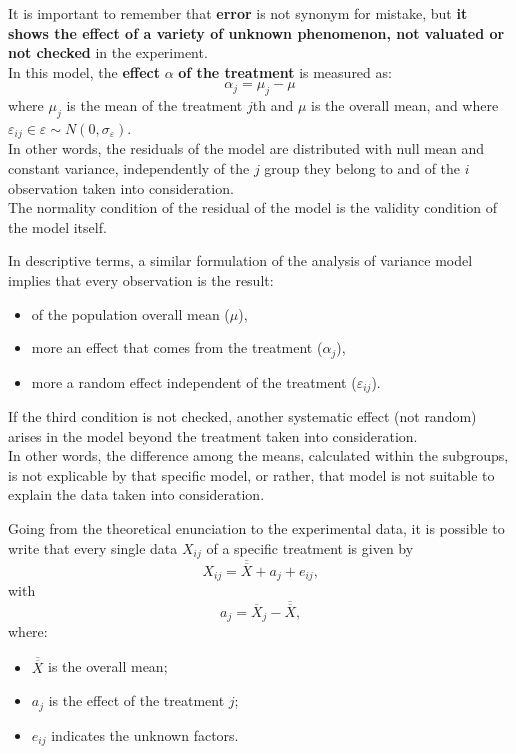 \begin{frame}
  It is important to remember that \textbf{error} is not synonym for mistake, but \textbf{it shows the effect of a variety of unknown phenomenon, not valuated or not checked} in the experiment.\\ 
  In this model, the \textbf{effect} {\boldmath$\alpha$} \textbf{of the treatment} is measured as:
  $$ \alpha_j = \mu_j - \mu $$
  where {\boldmath$\mu_j$} is the mean of the treatment $ j $th and {\boldmath$\mu$} is the overall mean, and where $ \varepsilon_{ij} \in \varepsilon \sim N(0,\sigma_\varepsilon) $.\\
  In other words, the residuals of the model are distributed with null mean and constant variance, independently of the $ j $ group they belong to and of the $ i $ observation taken into consideration.\\
  The normality condition of the residual of the model is the validity condition of the model itself.
\end{frame}

\begin{frame}
  \vspace*{.25cm} 
  In descriptive terms, a similar formulation of the analysis of variance model implies that every observation is the result:\\
  \begin{itemize}
    \item of the population overall mean ($ \mu $),
    \item more an effect that comes from the treatment ($ \alpha_j $),
    \item more a random effect independent of the treatment ($ \varepsilon_{ij} $).
  \end{itemize}
  \vspace*{.25cm}
  If the third condition is not checked, another systematic effect (not random) arises in the model beyond the treatment taken into consideration. \\
  \vspace*{.25cm} 
  In other words, the difference among the means, calculated within the subgroups, is not explicable by that specific model, or rather, that model is not suitable to explain the data taken into consideration.
\end{frame}

\begin{frame}
  \vspace*{.25cm} 
  Going from the theoretical enunciation to the experimental data, it is possible to write that every single data {\boldmath$X_{ij}$} of a specific treatment is given by
  $$ X_{ij} = \overline{\overline{X}}+a_j+e_{ij} \mbox{,} $$
  with
  $$ a_j = \overline{X}_j - \overline{\overline{X}} \mbox{,} $$
  where:
  \begin{itemize}
    \item $ \overline{\overline{X}} $ is the overall mean;
    \item $ a_j $ is the effect of the treatment $ j $; 
    \item $e_{ij} $ indicates the unknown factors.
  \end{itemize}
\end{frame}

